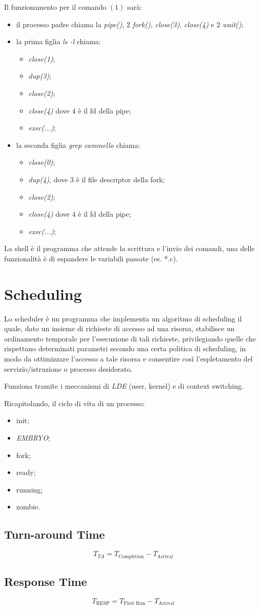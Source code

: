 Il funzionamento per il  comando $(1)$ sarà:
\begin{itemize}
  \item il processo padre chiama la \textit{pipe()}, $2$ \textit{fork()},
    \textit{close(3)}, \textit{close(4)} e $2$ \textit{wait()};
  \item la prima figlia \textit{ls -l} chiama:
    \begin{itemize}
      \item \textit{close(1)};
      \item \textit{dup(3)};
      \item \textit{close(2)};
      \item \textit{close(4)} dove $4$ è il fd della pipe;
      \item \textit{exec(...)};
    \end{itemize}
  \item la seconda figlia \textit{grep cammello} chiama:
    \begin{itemize}
      \item \textit{close(0)};
      \item \textit{dup(4)}, dove $3$ è il file descriptor della fork;
      \item \textit{close(2)};
      \item \textit{close(4)} dove $4$ è il fd della pipe;
      \item \textit{exec(...)};
    \end{itemize}
\end{itemize}

La shell è il programma che attende la scrittura e l'invio dei comandi, una
delle funzionalità è di espandere le variabili passate (es. *.c).

\section{Scheduling}
Lo scheduler è un programma che implementa un algoritmo di scheduling il quale,
dato un insieme di richieste di accesso ad una risorsa, stabilisce un
ordinamento temporale per l'esecuzione di tali richieste, privilegiando quelle
che rispettano determinati parametri secondo una certa politica di scheduling,
in modo da ottimizzare l'accesso a tale risorsa e consentire così
l'espletamento del servizio/istruzione o processo desiderato.

Funziona tramite i meccanismi di \emph{LDE} (user, kernel) e di context
switching.

Ricapitolando, il ciclo di vita di un processo:
\begin{itemize}
  \item init;
  \item \emph{EMBRYO};
  \item fork;
  \item ready;
  \item running;
  \item zombie.
\end{itemize}

\subsection{Turn-around Time}
\[
  T_{TA}=T_{ \text{Completion}}-T_{ \text{Arrival}}
\]

\subsection{Response Time}
\[
  T_ { \text{RESP}}=T_{ \text{First Run}}-T_{ \text{Arrival}}
\]
